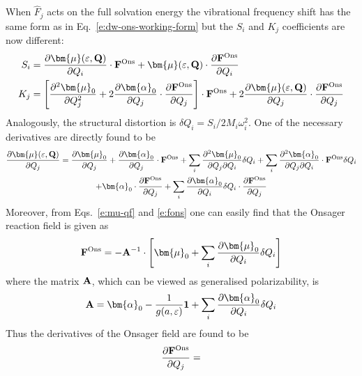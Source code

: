 \documentclass[a4paper,titlepage,twoside,fleqn,12pt]{book}
\newcommand{\BM}[1]{\bm{#1}}
\newcommand{\fderiv}[2]{\ensuremath{
    \frac{\partial #1}{\partial #2}}}
\newcommand{\sderiv}[2]{\ensuremath{
    \frac{\partial^2 #1}{\partial #2^2}
    }}
\newcommand{\sderivd}[3]{\ensuremath{
    \frac{\partial^2 #1}{\partial #2 \partial #3}
    }}
\begin{document}
\begin{refsection}
When $\hat{F}_j$ acts on the full solvation energy 
the vibrational frequency shift has the same form as 
in Eq.~\eqref{e:dw-ons-working-form}
but the $S_i$ and $K_j$ coefficients are now different:
%
\begin{subequations}
 \begin{align}
  S_i &= \fderiv{{\BM \mu}(\varepsilon,{\bf Q})}{Q_i} \cdot {\bf F}^{\rm Ons}
           + {\BM \mu}(\varepsilon,{\bf Q}) \cdot \fderiv{{\bf F}^{\rm Ons}}{Q_i}
        \label{e:ons-si-iter}  \\
  K_j &= \left[ 
             \sderiv{{\BM \mu}_0}{Q_j}  
        + 2 \fderiv{{\BM \alpha}_0}{Q_j}  \cdot \fderiv{{\bf F}^{\rm Ons}}{Q_j}
         \right] \cdot {\bf F}^{\rm Ons}
         + 2\fderiv{{\BM \mu}(\varepsilon,{\bf Q})}{Q_j} \cdot \fderiv{{\bf F}^{\rm Ons}}{Q_j}
        \label{e:ons-ki-iter}
 \end{align} %
\end{subequations}
%
Analogously, the structural distortion is 
$\delta Q_i=S_i/2M_i\omega_i^2$.
One of the necessary derivatives are directly found to be
%
\begin{multline} \label{e:mu-qf-derivative}
\fderiv{{\BM \mu}(\varepsilon,{\bf Q})}{Q_j} =
\fderiv{{\BM \mu}_0}{Q_j} + \fderiv{{\BM \alpha}_0}{Q_j}  \cdot {\bf F}^{\rm Ons}
+ \sum_i \sderivd{{\BM \mu}_0}{Q_j}{Q_i} \delta Q_i 
+ \sum_i \sderivd{{\BM \alpha}_0}{Q_j}{Q_i} \cdot {\bf F}^{\rm Ons} \delta Q_i \\
+ {\BM \alpha}_0  \cdot \fderiv{{\bf F}^{\rm Ons}}{Q_j} 
+ \sum_i \fderiv{{\BM \alpha}_0}{Q_i} \delta Q_i \cdot \fderiv{{\bf F}^{\rm Ons}}{Q_j} 
\end{multline}
%
Moreover, from Eqs.~\eqref{e:mu-qf}
and \eqref{e:fons} one can easily find that
the Onsager reaction field is given as
%
\begin{equation} \label{e:ons-field}
 {\bf F}^{\rm Ons} = -{\bf A}^{-1} \cdot 
\left[ 
   {\BM \mu}_0 + \sum_i \fderiv{{\BM \mu}_0}{Q_i}\delta Q_i
\right]
\end{equation}
%
where the matrix $\bf A$, which can be viewed as generalised polarizability,
is
%
\begin{equation} \label{e:a-matrix}
{\bf A} = {\BM \alpha}_0 - \frac{1}{g(a,\varepsilon)} {\bf 1}
   + \sum_i \fderiv{{\BM \alpha}_0}{Q_i}\delta Q_i
\end{equation}
%
Thus the derivatives of the Onsager field are found to be
%
\begin{equation} \label{e:ons-field-deriv}
\fderiv{{\bf F}^{\rm Ons}}{Q_j}  = 

\end{equation}
\end{refsection}
\end{document}

